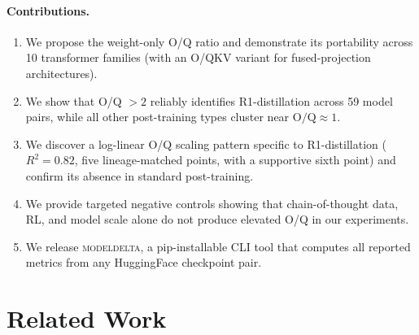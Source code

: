 \documentclass[11pt]{article}
\newcommand{\oq}{\text{O/Q}}
\newcommand{\modeldelta}{\textsc{modeldelta}}
\begin{document}
\paragraph{Contributions.}
\begin{enumerate}[nosep]
  \item We propose the weight-only O/Q ratio and demonstrate its portability
    across 10 transformer families (with an O/QKV variant for fused-projection
    architectures).
  \item We show that O/Q $> 2$ reliably identifies R1-distillation across
    59 model pairs, while all other post-training types cluster near $\oq \approx 1$.
  \item We discover a log-linear O/Q scaling pattern specific to R1-distillation
    ($R^2{=}0.82$, five lineage-matched points, with a supportive sixth point)
    and confirm its absence in standard post-training.
  \item We provide targeted negative controls showing that chain-of-thought data,
    RL, and model scale alone do not produce elevated O/Q in our experiments.
  \item We release \modeldelta{}, a pip-installable CLI tool that computes all
    reported metrics from any HuggingFace checkpoint pair.
\end{enumerate}


\section{Related Work}
\end{document}
